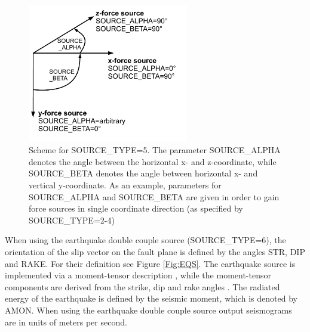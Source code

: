 \documentclass{hitec}
\begin{document}
\begin{figure}
\begin{center}
\includegraphics[width=7cm,angle=0]{eps/coordinate_system_customforcesource.pdf}
\end{center}
\caption{Scheme for SOURCE\_TYPE=5. The parameter SOURCE\_ALPHA denotes the angle between the horizontal x- and z-coordinate, while SOURCE\_BETA denotes the angle between horizontal x- and vertical y-coordinate. As an example, parameters for SOURCE\_ALPHA and SOURCE\_BETA are given in order to gain force sources in single coordinate direction (as specified by SOURCE\_TYPE=2-4)}
\label{coordinate_system_customforcesource}
\end{figure}


When using the earthquake double couple source (SOURCE\_TYPE=6), the orientation of the slip vector on the fault plane is defined by the angles STR, DIP and RAKE. For their definition see Figure \ref{Fig:EQS}. The earthquake source is implemented via a moment-tensor description \cite{graves:96}, while the moment-tensor components are derived from the strike, dip and rake angles \cite{aki:80}. The radiated energy of the earthquake is defined by the seismic moment, which is denoted by AMON. When using the earthquake double couple source output seismograms are in units of meters per second.

\end{document}
